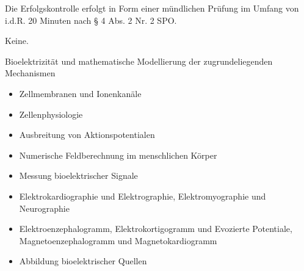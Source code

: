 \begin{course}

\setdoclanguagegerman
{}



\coursehead


\label{cour_8145.dp_997}


\begin{styleenv}
\begin{assessment}
Die Erfolgskontrolle erfolgt in Form einer mündlichen Prüfung im Umfang von i.d.R. 20 Minuten nach § 4 Abs. 2 Nr. 2 SPO.


\end{assessment}

\begin{conditions}Keine.\end{conditions}


\end{styleenv}

\begin{learningoutcomes}
Bioelektrizität und mathematische Modellierung der zugrundeliegenden Mechanismen


\end{learningoutcomes}

\begin{content}
\begin{itemize}\item  Zellmembranen und Ionenkanäle  \item  Zellenphysiologie  \item  Ausbreitung von Aktionspotentialen   \item  Numerische Feldberechnung im menschlichen Körper  \item  Messung bioelektrischer Signale  \item  Elektrokardiographie und Elektrographie, Elektromyographie und Neurographie  \item  Elektroenzephalogramm, Elektrokortigogramm und Evozierte Potentiale, Magnetoenzephalogramm und Magnetokardiogramm  \item  Abbildung bioelektrischer Quellen  \end{itemize}
\end{content}







\end{course}